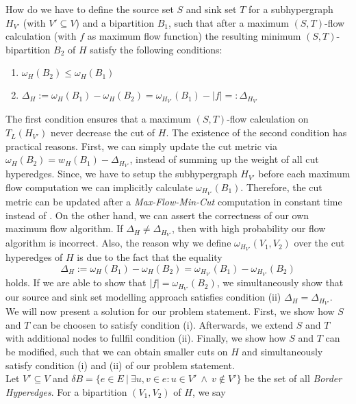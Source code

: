 \begin{problem}
\label{prob:ST}
How do we have to define the source set $S$ and sink set $T$ for a subhypergraph $H_{V'}$ 
(with $V' \subseteq V$) and a bipartition $B_1$, such that 
after a maximum $(S,T)$-flow calculation (with $f$ as maximum flow function)
the resulting minimum $(S,T)$-bipartition $B_2$ of $H$ satisfy the following conditions:
\begin{enumerate}
\item $\omega_H(B_2) \le \omega_H(B_1)$
\item $\Delta_{H} := \omega_H(B_1) - \omega_H(B_2) = \omega_{H_{V'}}(B_1) - |f| =: \Delta_{H_{V'}}$
\end{enumerate}
\end{problem}

The first condition ensures that a maximum $(S,T)$-flow calculation on $T_L(H_{V'})$ never 
decrease the cut of $H$. The existence of the second condition has practical reasons. First, we
can simply update the cut metric via $\omega_H(B_2) = w_H(B_1) - \Delta_{H_{V'}}$,
instead of summing up the weight of all cut hyperedges. Since, we have to setup the subhypergraph
$H_{V'}$ before each maximum flow computation we can implicitly calculate $\omega_{H_{V'}}(B_1)$.
Therefore, the cut metric can be updated after a \emph{Max-Flow-Min-Cut} computation
in constant time instead of . On the other hand, we can assert the correctness of
our own maximum flow algorithm. If $\Delta_H \neq \Delta_{H_{V'}}$, then with high probability our
flow algorithm is incorrect. Also, the reason why we define $\omega_{H_{V'}}(V_1,V_2)$ over
the cut hyperedges of $H$ is due to the fact that the equality
\[\Delta_{H} := \omega_H(B_1) - \omega_H(B_2) = \omega_{H_{V'}}(B_1) - \omega_{H_{V'}}(B_2)\]
holds. If we are able to show that $|f| = \omega_{H_{V'}}(B_2)$, we simultaneously show
that our source and sink set modelling approach satisfies condition (ii) 
$\Delta_H = \Delta_{H_{V'}}$.\\
We will now present a solution for our problem statement. First, we show how $S$ and $T$
can be choosen to satisfy condition (i). Afterwards, we extend $S$ and $T$ with additional
nodes to fullfil condition (ii). Finally, we show how $S$ and $T$ can be modified, such that
we can obtain smaller cuts on $H$ and simultaneously satisfy condition (i) and (ii) of our problem
statement. \\
Let $V' \subseteq V$ and $\delta B = \{ e \in E\ |\ \exists u,v \in e: u \in V'\ \land\ v \notin V' \}$
be the set of all \emph{Border Hyperedges}. For a bipartition $(V_1,V_2)$ of $H$, we say
